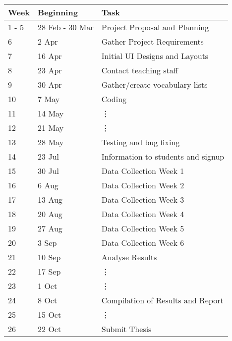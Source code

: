 \begin{tabular} { l | l || l }
	Week & Beginning & Task \\
	\hline
	1 - 5 & 28 Feb - 30 Mar & Project Proposal and Planning \\
	6       & 2 Apr           & Gather Project Requirements  \\
	7       & 16 Apr          & Initial UI Designs and Layouts  \\  
	8       & 23 Apr          & Contact teaching staff          \\  
	9       & 30 Apr          & Gather/create vocabulary lists  \\  
	10      & 7 May           & Coding                         \\  
	11      & 14 May          & \vdots                          \\  
	12      & 21 May          & \vdots                          \\  
	13      & 28 May          & Testing and bug fixing          \\  
	14      & 23 Jul          & Information to students and signup \\  
	15      & 30 Jul          & Data Collection Week 1          \\  
	16      & 6 Aug           & Data Collection Week 2          \\  
	17      & 13 Aug          & Data Collection Week 3          \\  
	18      & 20 Aug          & Data Collection Week 4          \\  
	19      & 27 Aug          & Data Collection Week 5          \\  
	20      & 3 Sep           & Data Collection Week 6          \\  
	21      & 10 Sep          & Analyse Results                 \\  
	22      & 17 Sep          & \vdots                          \\  
	23      & 1 Oct           & \vdots                          \\  
	24      & 8 Oct           & Compilation of Results and Report \\
	25      & 15 Oct          & \vdots                          \\  
	26      & 22 Oct          & Submit Thesis  \\  
\end{tabular}
